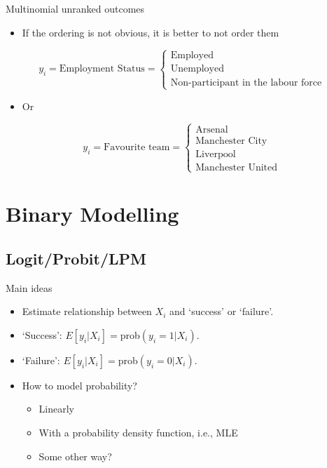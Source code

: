 \documentclass[
  ignorenonframetext,
]{beamer}
\providecommand{\tightlist}{%
  \setlength{\itemsep}{0pt}\setlength{\parskip}{0pt}}
\begin{document}
\begin{frame}{Multinomial unranked outcomes}
\protect{}\label{multinomial-unranked-outcomes}
\begin{itemize}
\tightlist
\item
  If the ordering is not obvious, it is better to not order them
\end{itemize}

\[
y_i = \text{Employment Status} = \begin{cases}
\text{Employed} \\
\text{Unemployed} \\
\text{Non-participant in the labour force}
\end{cases}
\]

\begin{itemize}
\tightlist
\item
  Or
\end{itemize}

\[
y_i = \text{Favourite team} = \begin{cases}
\text{Arsenal} \\
\text{Manchester City} \\
\text{Liverpool} \\
\text{Manchester United}
\end{cases}
\]
\end{frame}

\section{Binary Modelling}\label{binary-modelling}

\subsection{Logit/Probit/LPM}\label{logitprobitlpm}

\begin{frame}{Main ideas}
\protect{}\label{main-ideas}
\begin{itemize}
\tightlist
\item
  Estimate relationship between \(X_i\) and `success' or `failure'.
\item
  `Success': \(E[y_i|X_i] =\)prob\((y_i=1|X_i)\).
\item
  `Failure': \(E[y_i|X_i] =\)prob\((y_i=0|X_i)\).
\item
  How to model probability?

  \begin{itemize}
  \tightlist
  \item
    Linearly
  \item
    With a probability density function, i.e., MLE
  \item
    Some other way?
  \end{itemize}
\end{itemize}
\end{frame}
\end{document}
